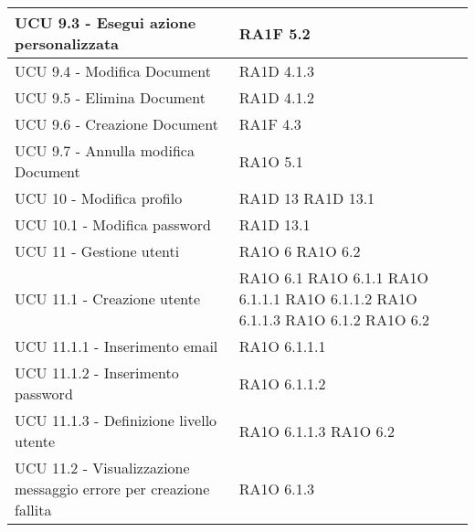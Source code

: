 \begin{center}
\begin{longtable}{ | p{5cm} | p{5cm} |}
						UCU 9.3 - Esegui azione personalizzata &  RA1F 5.2 \newline  \\ \hline      
						UCU 9.4 - Modifica Document &  RA1D 4.1.3 \newline  \\ \hline      
						UCU 9.5 - Elimina Document &  RA1D 4.1.2 \newline  \\ \hline      
						UCU 9.6 - Creazione Document &  RA1F 4.3 \newline  \\ \hline      
						UCU 9.7 - Annulla modifica Document &  RA1O 5.1 \newline  \\ \hline      
						UCU 10 - Modifica profilo &  RA1D 13 \newline  RA1D 13.1 \newline  \\ \hline      
						UCU 10.1 - Modifica password &  RA1D 13.1 \newline  \\ \hline      
						UCU 11 - Gestione utenti &  RA1O 6 \newline  RA1O 6.2 \newline  \\ \hline      
						UCU 11.1 - Creazione utente &  RA1O 6.1 \newline  RA1O 6.1.1 \newline  RA1O 6.1.1.1 \newline  RA1O 6.1.1.2 \newline  RA1O 6.1.1.3 \newline  RA1O 6.1.2 \newline  RA1O 6.2 \newline  \\ \hline      
						UCU 11.1.1 - Inserimento email &  RA1O 6.1.1.1 \newline  \\ \hline      
						UCU 11.1.2 - Inserimento password &  RA1O 6.1.1.2 \newline  \\ \hline      
						UCU 11.1.3 - Definizione livello utente &  RA1O 6.1.1.3 \newline  RA1O 6.2 \newline  \\ \hline      
						UCU 11.2 - Visualizzazione messaggio errore per creazione fallita &  RA1O 6.1.3 \newline  \\ \hline      

\end{longtable}
\end{center}
